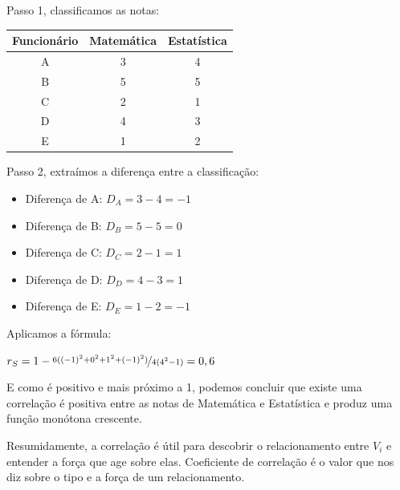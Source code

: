 \documentclass[a4paper,11pt]{article}
\begin{document}
Passo 1, classificamos as notas:
\begin{table}[H]
	\centering 
	\begin{tabular}{c|c|c}
		\textbf{Funcionário} & \textbf{Matemática} & \textbf{Estatística} \\ \hline
		A & 3 & 4 \\ \hline
		B & 5 & 5 \\ \hline
		C & 2 & 1 \\ \hline
		D & 4 & 3 \\ \hline
		E & 1 & 2
	\end{tabular}
\end{table}

Passo 2, extraímos a diferença entre a classificação:
\begin{itemize}[nolistsep]
	\item Diferença de A: $D_A = 3 - 4 = -1$
	\item Diferença de B: $D_B = 5 - 5 = 0$
	\item Diferença de C: $D_C = 2 - 1 = 1$
	\item Diferença de D: $D_D = 4 - 3 = 1$
	\item Diferença de E: $D_E = 1 - 2 = -1$
\end{itemize}

Aplicamos a fórmula:

$r_S = 1 - \nicefrac{6 ((-1)^2 + 0^2 + 1^2 + (-1)^2)}{4 (4^2-1)} = 0,6$

E como é positivo e mais próximo a 1, podemos concluir que existe uma correlação é positiva entre as notas de Matemática e Estatística e produz uma função monótona crescente.

Resumidamente, a correlação é útil para descobrir o relacionamento entre $V_{i}$ e entender a força que age sobre elas. Coeficiente de correlação é o valor que nos diz sobre o tipo e a força de um relacionamento.
	
\end{document}
